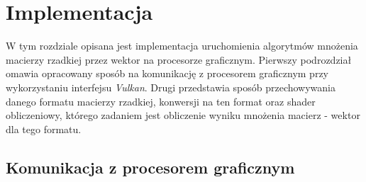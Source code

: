 \chapter{Implementacja}
\label{cha:implementacja}

W tym rozdziale opisana jest implementacja uruchomienia algorytmów mnożenia macierzy rzadkiej przez wektor na procesorze graficznym.
Pierwszy podrozdział omawia opracowany sposób na komunikację z procesorem graficznym przy wykorzystaniu interfejsu \textit{Vulkan}.
Drugi przedstawia sposób przechowywania danego formatu macierzy rzadkiej, konwersji na ten format oraz shader obliczeniowy, którego zadaniem jest obliczenie wyniku mnożenia macierz - wektor dla tego formatu.

\section{Komunikacja z procesorem graficznym}
\label{cha:graphics_comm}

